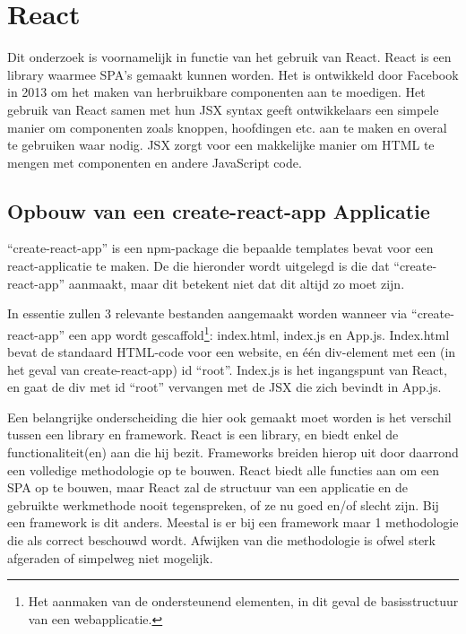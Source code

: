 \section{React}

Dit onderzoek is voornamelijk in functie van het gebruik van React. React is een library waarmee SPA's gemaakt kunnen worden. Het is ontwikkeld door Facebook in 2013 om het maken van herbruikbare componenten aan te moedigen. Het gebruik van React samen met hun JSX syntax geeft ontwikkelaars een simpele manier om componenten zoals knoppen, hoofdingen etc. aan te maken en overal te gebruiken waar nodig. JSX zorgt voor een makkelijke manier om HTML te mengen met componenten en andere JavaScript code.

\subsection{Opbouw van een create-react-app Applicatie}

``create-react-app'' is een npm-package die bepaalde templates bevat voor een react-applicatie te maken. De die hieronder wordt uitgelegd is die dat ``create-react-app'' aanmaakt, maar dit betekent niet dat dit altijd zo moet zijn. 

In essentie zullen 3 relevante bestanden aangemaakt worden wanneer via ``create-react-app'' een app wordt gescaffold\footnote{Het aanmaken van de ondersteunend elementen, in dit geval de basisstructuur van een webapplicatie.}: index.html, index.js en App.js. Index.html bevat de standaard HTML-code voor een website, en één div-element met een (in het geval van create-react-app) id ``root''. Index.js is het ingangspunt van React, en gaat de div met id ``root'' vervangen met de JSX die zich bevindt in App.js.

Een belangrijke onderscheiding die hier ook gemaakt moet worden is het verschil tussen een library en framework. React is een library, en biedt enkel de functionaliteit(en) aan die hij bezit. Frameworks breiden hierop uit door daarrond een volledige methodologie op te bouwen. React biedt alle functies aan om een SPA op te bouwen, maar React zal de structuur van een applicatie en de gebruikte werkmethode nooit tegenspreken, of ze nu goed en/of slecht zijn. Bij een framework is dit anders. Meestal is er bij een framework maar 1 methodologie die als correct beschouwd wordt. Afwijken van die methodologie is ofwel sterk afgeraden of simpelweg niet mogelijk. \autocite{roy_2022}


